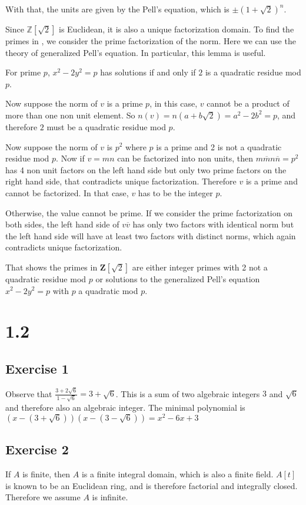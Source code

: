 \documentclass{article}
\begin{document}
With that, the units are given by the Pell's equation, which is $ \pm(1+\sqrt{2})^n $.

Since $ \mathbb{Z}[\sqrt{2}] $ is Euclidean, it is also a unique factorization domain. To find the primes in , we consider the prime factorization of the norm. Here we can use the theory of generalized Pell's equation. In particular, this lemma is useful.

For prime $ p $, $ x^2 - 2y^2 = p $ has solutions if and only if $ 2 $ is a quadratic residue mod $ p $.

Now suppose the norm of $ v $ is a prime $ p $, in this case, $ v $ cannot be a product of more than one non unit element. So $ n(v) = n(a + b\sqrt{2}) = a^2 - 2b^2 = p $, and therefore $ 2 $ must be a quadratic residue mod $ p $.

Now suppose the norm of $ v $ is $ p^2 $ where $ p $ is a prime and 2 is not a quadratic residue mod $ p $. Now if $ v = mn $ can be factorized into non units, then $ m\overline{m}n\overline{n} = p^2 $ has 4 non unit factors on the left hand side but only two prime factors on the right hand side, that contradicts unique factorization. Therefore $ v $ is a prime and cannot be factorized. In that case, $ v $ has to be the integer $ p $.

Otherwise, the value cannot be prime. If we consider the prime factorization on both sides, the left hand side of $ v\overline{v} $ has only two factors with identical norm but the left hand side will have at least two factors with distinct norms, which again contradicts unique factorization.

That shows the primes in $ \mathbf{Z}[\sqrt{2}] $ are either integer primes with 2 not a quadratic residue mod $ p $ or solutions to the generalized Pell's equation $ x^2 - 2y^2 = p $ with $ p $ a quadratic mod $ p $.

\section{1.2}
\subsection{Exercise 1}
Observe that $ \frac{3 + 2\sqrt{6}}{1 - \sqrt{6}} = 3 + \sqrt{6} $. This is a sum of two algebraic integers $ 3 $ and $ \sqrt{6} $ and therefore also an algebraic integer. The minimal polynomial is $ (x - (3 + \sqrt{6}))(x - (3 - \sqrt{6})) = x^2 - 6x + 3 $
\subsection{Exercise 2}
If $ A $ is finite, then $ A $ is a finite integral domain, which is also a finite field. $ A[t] $ is known to be an Euclidean ring, and is therefore factorial and integrally closed. Therefore we assume $ A $ is infinite.
\end{document}
